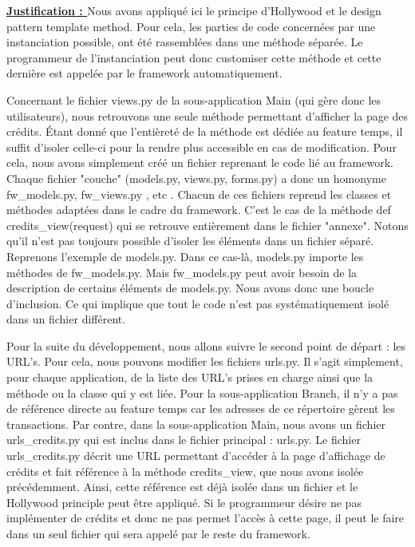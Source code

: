 \textbf{\underline{Justification : }} Nous avons appliqué ici le principe d'Hollywood et le design pattern template method.  Pour cela,  les parties de code concernées par une instanciation possible,  ont été rassemblées dans une méthode séparée.  Le programmeur de l'instanciation peut donc customiser cette méthode et cette dernière est appelée par le framework automatiquement.

Concernant le fichier views.py de la sous-application Main (qui gère donc les utilisateurs),  nous retrouvons une seule méthode permettant d'afficher la page des crédits.  Étant donné que l'entièreté de la méthode est dédiée au feature temps,  il suffit d'isoler celle-ci pour la rendre plus accessible en cas de modification.  Pour cela,  nous avons simplement créé un fichier reprenant le code lié au framework.  Chaque fichier "couche" (models.py,  views.py,  forms.py) a donc un homonyme fw\_models.py,  fw\_views.py ,  etc .  Chacun de ces fichiers reprend les classes et méthodes adaptées dans le cadre du framework.  C'est le cas de la méthode def credits\_view(request) qui se retrouve entièrement dans le fichier "annexe".  Notons qu'il n'est pas toujours possible d'isoler les éléments dans un fichier séparé.  Reprenons l'exemple de models.py.  Dans ce cas-là,  models.py importe les méthodes de fw\_models.py.  Mais fw\_models.py peut avoir besoin de la description de certains éléments de models.py.  Nous avons donc une boucle d'inclusion.  Ce qui implique que tout le code n'est pas systématiquement isolé dans un fichier différent.  

Pour la suite du développement,  nous allons suivre le second point de départ : les URL's.  Pour cela,  nous pouvons modifier les fichiers urls.py.  Il s'agit simplement,  pour chaque application,  de la liste des URL's prises en charge ainsi que la méthode ou la classe qui y est liée.  Pour la sous-application Branch,  il n'y a pas de référence directe au feature temps car les adresses de ce répertoire gèrent les transactions.  Par contre,  dans la sous-application Main,  nous avons un fichier urls\_credits.py qui est inclus dans le fichier principal : urls.py.  Le fichier urls\_credits.py décrit une URL permettant d'accéder à la page d'affichage de crédits et fait référence à la méthode credits\_view,  que nous avons isolée précédemment.  Ainsi,  cette référence est déjà isolée dans un fichier et le Hollywood principle peut être appliqué.  Si le programmeur désire ne pas implémenter de crédits et donc ne pas permet l'accès à cette page,  il peut le faire dans un seul fichier qui sera appelé par le reste du framework.

